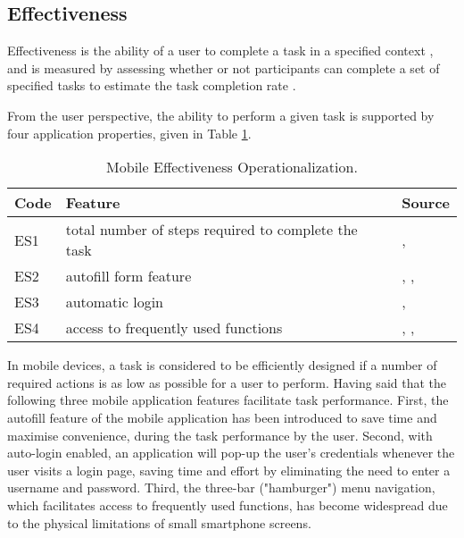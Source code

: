 \documentclass[preprint,12pt]{elsarticle}
\begin{document}
\subsection{Effectiveness}
Effectiveness is the ability of a user to complete a task in a specified context \cite{harrison2013usability, parsazadeh2018framework}, and is measured by assessing whether or not participants can complete a set of specified tasks to estimate the task completion rate \cite{miguel2017voice}. 

From the user perspective, the ability to perform a given task is supported by four application properties, given in Table \ref{tab:oper-effectiveness}.

\begin{table}[h]
\caption{Mobile Effectiveness Operationalization.}
\label{tab:oper-effectiveness}
\footnotesize
\begin{tabular}{|l|p{9cm}|p{2.5cm}|}
\hline
\textbf{Code}  & \textbf{Feature}     & \textbf{Source} \\ \hline
ES1 &  total number of steps required to complete the task & \cite{restuputri2022role}, \cite{weichbroth2020usability} \cite{weichbroth2022empirical}        \\ \hline
ES2 &  autofill form feature      &  \cite{rukzio2008automatic}, \cite{oesch2021emperor}, \cite{simmons2021systematization}      \\ \hline
ES3 &  automatic login   &   \cite{zhu2019riskcog}, \cite{shin2023heuristic}      \\ \hline
ES4 &  access to frequently used functions & \cite{mahamad2007user}, \cite{kern2009design}, \cite{yang2022influence} \\ \hline
\end{tabular}
\end{table}

In mobile devices, a task is considered to be efficiently designed if a number of required actions is as low as possible for a user to perform. Having said that the following three mobile application features facilitate task performance.  
First, the autofill feature of the mobile application has been introduced to save time and maximise convenience, during the task performance by the user. Second, with auto-login enabled, an application will pop-up the user's credentials whenever the user visits a login page, saving time and effort by eliminating the need to enter a username and password. 
Third, the three-bar ("hamburger") menu navigation, which facilitates access to frequently used functions, has become widespread due to the physical limitations of small smartphone screens.
\end{document}
